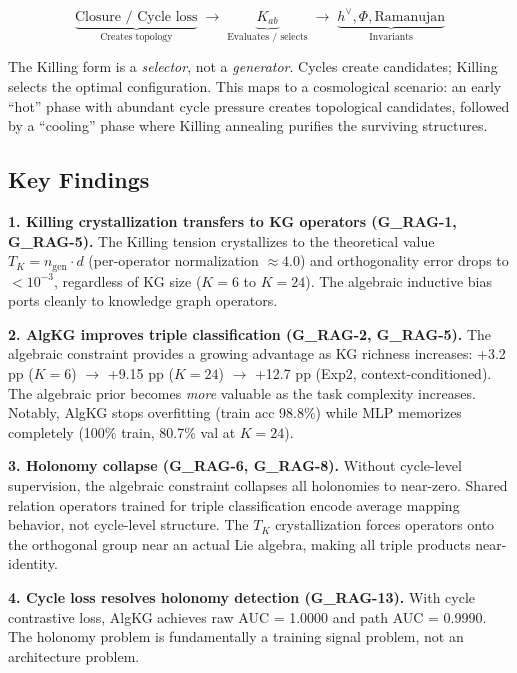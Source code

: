 \documentclass[11pt,letterpaper]{article}
\begin{document}
\begin{equation}
\underbrace{\text{Closure / Cycle loss}}_{\text{Creates topology}} \;\to\; \underbrace{K_{ab}}_{\text{Evaluates / selects}} \;\to\; \underbrace{h^\vee, \Phi, \text{Ramanujan}}_{\text{Invariants}}
\end{equation}

The Killing form is a \textit{selector}, not a \textit{generator}. Cycles create candidates; Killing selects the optimal configuration. This maps to a cosmological scenario: an early ``hot'' phase with abundant cycle pressure creates topological candidates, followed by a ``cooling'' phase where Killing annealing purifies the surviving structures.

\subsection{Key Findings}

\textbf{1. Killing crystallization transfers to KG operators (G\_RAG-1, G\_RAG-5).} The Killing tension crystallizes to the theoretical value $T_K = n_{\text{gen}} \cdot d$ (per-operator normalization $\approx 4.0$) and orthogonality error drops to $< 10^{-3}$, regardless of KG size ($K = 6$ to $K = 24$). The algebraic inductive bias ports cleanly to knowledge graph operators.

\textbf{2. AlgKG improves triple classification (G\_RAG-2, G\_RAG-5).} The algebraic constraint provides a growing advantage as KG richness increases: +3.2 pp ($K = 6$) $\to$ +9.15 pp ($K = 24$) $\to$ +12.7 pp (Exp2, context-conditioned). The algebraic prior becomes \textit{more} valuable as the task complexity increases. Notably, AlgKG stops overfitting (train acc 98.8\%) while MLP memorizes completely (100\% train, 80.7\% val at $K = 24$).

\textbf{3. Holonomy collapse (G\_RAG-6, G\_RAG-8).} Without cycle-level supervision, the algebraic constraint collapses all holonomies to near-zero. Shared relation operators trained for triple classification encode average mapping behavior, not cycle-level structure. The $T_K$ crystallization forces operators onto the orthogonal group near an actual Lie algebra, making all triple products near-identity.

\textbf{4. Cycle loss resolves holonomy detection (G\_RAG-13).} With cycle contrastive loss, AlgKG achieves raw AUC = 1.0000 and path AUC = 0.9990. The holonomy problem is fundamentally a training signal problem, not an architecture problem.
\end{document}
